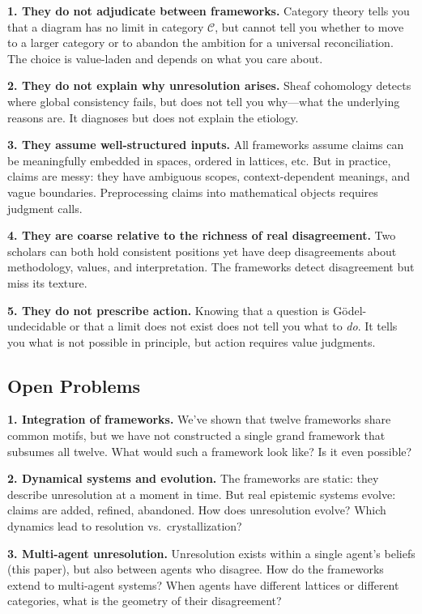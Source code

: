 \documentclass[11pt,letterpaper]{article}
\theoremstyle{definition}
\theoremstyle{remark}
\begin{document}
\textbf{1. They do not adjudicate between frameworks.} Category theory tells you that a diagram has no limit in category $\mathcal{C}$, but cannot tell you whether to move to a larger category or to abandon the ambition for a universal reconciliation. The choice is value-laden and depends on what you care about.

\textbf{2. They do not explain why unresolution arises.} Sheaf cohomology detects where global consistency fails, but does not tell you why---what the underlying reasons are. It diagnoses but does not explain the etiology.

\textbf{3. They assume well-structured inputs.} All frameworks assume claims can be meaningfully embedded in spaces, ordered in lattices, etc. But in practice, claims are messy: they have ambiguous scopes, context-dependent meanings, and vague boundaries. Preprocessing claims into mathematical objects requires judgment calls.

\textbf{4. They are coarse relative to the richness of real disagreement.} Two scholars can both hold consistent positions yet have deep disagreements about methodology, values, and interpretation. The frameworks detect disagreement but miss its texture.

\textbf{5. They do not prescribe action.} Knowing that a question is Gödel-undecidable or that a limit does not exist does not tell you what to \emph{do}. It tells you what is not possible in principle, but action requires value judgments.

\subsection{Open Problems}

\textbf{1. Integration of frameworks.} We've shown that twelve frameworks share common motifs, but we have not constructed a single grand framework that subsumes all twelve. What would such a framework look like? Is it even possible?

\textbf{2. Dynamical systems and evolution.} The frameworks are static: they describe unresolution at a moment in time. But real epistemic systems evolve: claims are added, refined, abandoned. How does unresolution evolve? Which dynamics lead to resolution vs.\ crystallization?

\textbf{3. Multi-agent unresolution.} Unresolution exists within a single agent's beliefs (this paper), but also between agents who disagree. How do the frameworks extend to multi-agent systems? When agents have different lattices or different categories, what is the geometry of their disagreement?
\end{document}
